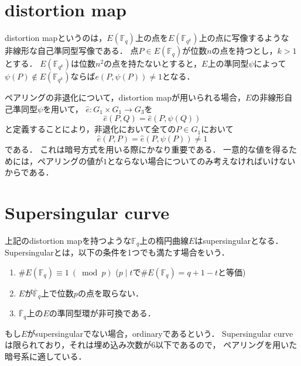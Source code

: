 \section{distortion map}
\par

distortion mapというのは，$E(\mathbb{F} _q)$上の点を$E(\mathbb{F} _{q ^k})$上の点に写像するような
非線形な自己準同型写像である．
点$P \in E(\mathbb{F} _q)$が位数$n$の点を持つとし，$k > 1$とする．
$E(\mathbb{F} _{q ^k})$は位数$n ^2$の点を持たないとすると，$E$上の準同型$\psi$によって
$\psi(P) \notin E(\mathbb{F} _{q ^k})$ならば$e(P, \psi(P)) \not= 1$となる．
\par
ペアリングの非退化について，distortion mapが用いられる場合，$E$の非線形自己準同型$\psi$を用いて，
$\hat{e} : G _1 \times G _1 \to G _3$を
\[
\hat{e}(P, Q) = \hat{e}(P, \psi(Q))
\]
と定義することにより，非退化において全ての$P \in G _1$において
\[
\hat{e}(P, P) = \hat{e}(P, \psi(P)) \not= 1
\]
である．
これは暗号方式を用いる際にかなり重要である．
一意的な値を得るためには，ペアリングの値が$1$とならない場合についてのみ考えなければいけないからである．\\
\par
\section{Supersingular curve}
\par
上記のdistortion mapを持つような$\mathbb{F} _q$上の楕円曲線$E$はsupersingularとなる．
Supersingularとは，以下の条件を1つでも満たす場合をいう．
\begin{enumerate}
  \item $\# E(\mathbb{F} _q) \equiv 1 \ (\bmod p)$
        ($p \mid t$で$\# E(\mathbb{F} _q) = q + 1 - t$と等価)
  \item $E$が$\overline{\mathbb{F}} _q$上で位数$p$の点を取らない．
  \item $\overline{\mathbb{F}} _q$上の$E$の準同型環が非可換である．
\end{enumerate}
もし$E$がsupersingularでない場合，ordinaryであるという．
Supersingular curveは限られており，それは埋め込み次数が$6$以下であるので，
ペアリングを用いた暗号系に適している．\\
